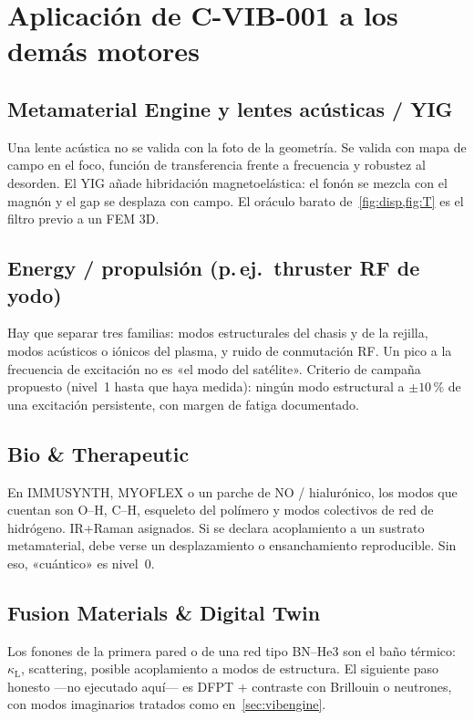 \documentclass[11pt,a4paper]{article}
\begin{document}
\section{Aplicación de C-VIB-001 a los demás motores}
\label{sec:aplicaciones}

\subsection{Metamaterial Engine y lentes acústicas / YIG}

Una lente acústica no se valida con la foto de la geometría. Se valida con mapa de campo en el foco, función de transferencia frente a frecuencia y robustez al desorden. El YIG añade hibridación magnetoelástica: el fonón se mezcla con el magnón y el gap se desplaza con campo. El oráculo barato de~\cref{fig:disp,fig:T} es el filtro previo a un FEM 3D.

\subsection{Energy / propulsión (p.\,ej.\ thruster RF de yodo)}

Hay que separar tres familias: modos estructurales del chasis y de la rejilla, modos acústicos o iónicos del plasma, y ruido de conmutación RF. Un pico a la frecuencia de excitación no es «el modo del satélite». Criterio de campaña propuesto (nivel~1 hasta que haya medida): ningún modo estructural a $\pm 10\,\%$ de una excitación persistente, con margen de fatiga documentado.

\subsection{Bio \& Therapeutic}

En IMMUSYNTH, MYOFLEX o un parche de NO / hialurónico, los modos que cuentan son O--H, C--H, esqueleto del polímero y modos colectivos de red de hidrógeno. IR+Raman asignados. Si se declara acoplamiento a un sustrato metamaterial, debe verse un desplazamiento o ensanchamiento reproducible. Sin eso, «cuántico» es nivel~0.

\subsection{Fusion Materials \& Digital Twin}

Los fonones de la primera pared o de una red tipo BN--He3 son el baño térmico: $\kappa_{\mathrm{L}}$, scattering, posible acoplamiento a modos de estructura. El siguiente paso honesto ---no ejecutado aquí--- es DFPT + contraste con Brillouin o neutrones, con modos imaginarios tratados como en~\cref{sec:vibengine}.
\end{document}
